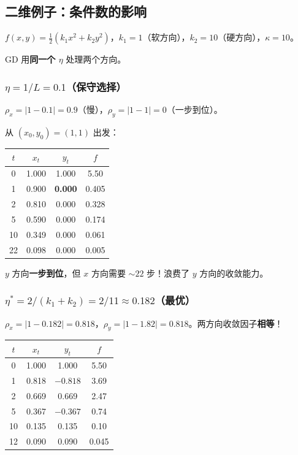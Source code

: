 \documentclass[12pt, a4paper]{ctexart}
\begin{document}
\subsection{二维例子：条件数的影响}

$f(x,y) = \frac{1}{2}(k_1 x^2 + k_2 y^2)$，$k_1 = 1$（软方向），$k_2 = 10$（硬方向），$\kappa = 10$。

GD 用\textbf{同一个 $\eta$} 处理两个方向。

\subsubsection{$\eta = 1/L = 0.1$（保守选择）}

$\rho_x = |1 - 0.1| = 0.9$（慢），$\rho_y = |1 - 1| = 0$（一步到位）。

从 $(x_0, y_0) = (1, 1)$ 出发：

\begin{center}
\begin{tabular}{c|cc|c}
$t$ & $x_t$ & $y_t$ & $f$ \\
\hline
0 & 1.000 & 1.000 & 5.50 \\
1 & 0.900 & \textbf{0.000} & 0.405 \\
2 & 0.810 & 0.000 & 0.328 \\
5 & 0.590 & 0.000 & 0.174 \\
10 & 0.349 & 0.000 & 0.061 \\
22 & 0.098 & 0.000 & 0.005 \\
\end{tabular}
\end{center}

$y$ 方向\textbf{一步到位}，但 $x$ 方向需要 $\sim 22$ 步！浪费了 $y$ 方向的收敛能力。

\subsubsection{$\eta^* = 2/(k_1 + k_2) = 2/11 \approx 0.182$（最优）}

$\rho_x = |1 - 0.182| = 0.818$，$\rho_y = |1 - 1.82| = 0.818$。两方向收敛因子\textbf{相等}！

\begin{center}
\begin{tabular}{c|cc|c}
$t$ & $x_t$ & $y_t$ & $f$ \\
\hline
0 & 1.000 & 1.000 & 5.50 \\
1 & 0.818 & $-0.818$ & 3.69 \\
2 & 0.669 & 0.669 & 2.47 \\
5 & 0.367 & $-0.367$ & 0.74 \\
10 & 0.135 & 0.135 & 0.10 \\
12 & 0.090 & 0.090 & 0.045 \\
\end{tabular}
\end{center}
\end{document}

